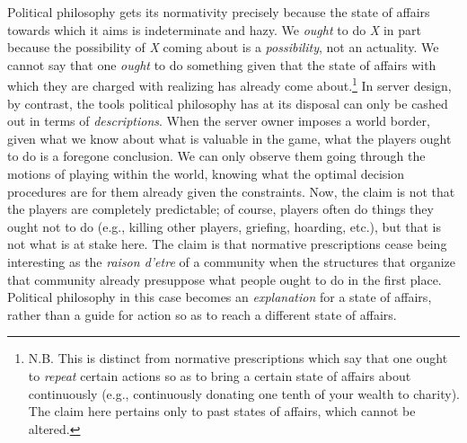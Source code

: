 Political philosophy gets its normativity precisely because the state of affairs towards which it aims is indeterminate and hazy. We \emph{ought} to do \emph{X} in part because the possibility of \emph{X} coming about is a \emph{possibility}, not an actuality. We cannot say that one \emph{ought} to do something given that the state of affairs with which they are charged with realizing has already come about.\footnote{N.B. This is distinct from normative prescriptions which say that one ought to \emph{repeat} certain actions so as to bring a certain state of affairs about continuously (e.g., continuously donating one tenth of your wealth to charity). The claim here pertains only to past states of affairs, which cannot be altered.} In server design, by contrast, the tools political philosophy has at its disposal can only be cashed out in terms of \emph{descriptions}. When the server owner imposes a world border, given what we know about what is valuable in the game, what the players ought to do is a foregone conclusion. We can only observe them going through the motions of playing within the world, knowing what the optimal decision procedures are for them already given the constraints. Now, the claim is not that the players are completely predictable; of course, players often do things they ought not to do (e.g., killing other players, griefing, hoarding, etc.), but that is not what is at stake here. The claim is that normative prescriptions cease being interesting as the \emph{raison d’etre} of a community when the structures that organize that community already presuppose what people ought to do in the first place. Political philosophy in this case becomes an \emph{explanation} for a state of affairs, rather than a guide for action so as to reach a different state of affairs.

